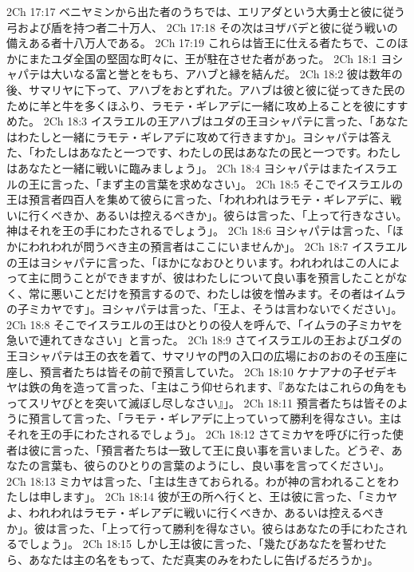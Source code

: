 2Ch 17:17  ベニヤミンから出た者のうちでは、エリアダという大勇士と彼に従う弓および盾を持つ者二十万人、
2Ch 17:18  その次はヨザバデと彼に従う戦いの備えある者十八万人である。
2Ch 17:19  これらは皆王に仕える者たちで、このほかにまたユダ全国の堅固な町々に、王が駐在させた者があった。
2Ch 18:1  ヨシャパテは大いなる富と誉とをもち、アハブと縁を結んだ。
2Ch 18:2  彼は数年の後、サマリヤに下って、アハブをおとずれた。アハブは彼と彼に従ってきた民のために羊と牛を多くほふり、ラモテ・ギレアデに一緒に攻め上ることを彼にすすめた。
2Ch 18:3  イスラエルの王アハブはユダの王ヨシャパテに言った、「あなたはわたしと一緒にラモテ・ギレアデに攻めて行きますか」。ヨシャパテは答えた、「わたしはあなたと一つです、わたしの民はあなたの民と一つです。わたしはあなたと一緒に戦いに臨みましょう」。
2Ch 18:4  ヨシャパテはまたイスラエルの王に言った、「まず主の言葉を求めなさい」。
2Ch 18:5  そこでイスラエルの王は預言者四百人を集めて彼らに言った、「われわれはラモテ・ギレアデに、戦いに行くべきか、あるいは控えるべきか」。彼らは言った、「上って行きなさい。神はそれを王の手にわたされるでしょう」。
2Ch 18:6  ヨシャパテは言った、「ほかにわれわれが問うべき主の預言者はここにいませんか」。
2Ch 18:7  イスラエルの王はヨシャパテに言った、「ほかになおひとりいます。われわれはこの人によって主に問うことができますが、彼はわたしについて良い事を預言したことがなく、常に悪いことだけを預言するので、わたしは彼を憎みます。その者はイムラの子ミカヤです」。ヨシャパテは言った、「王よ、そうは言わないでください」。
2Ch 18:8  そこでイスラエルの王はひとりの役人を呼んで、「イムラの子ミカヤを急いで連れてきなさい」と言った。
2Ch 18:9  さてイスラエルの王およびユダの王ヨシャパテは王の衣を着て、サマリヤの門の入口の広場におのおのその玉座に座し、預言者たちは皆その前で預言していた。
2Ch 18:10  ケナアナの子ゼデキヤは鉄の角を造って言った、「主はこう仰せられます、『あなたはこれらの角をもってスリヤびとを突いて滅ぼし尽しなさい』」。
2Ch 18:11  預言者たちは皆そのように預言して言った、「ラモテ・ギレアデに上っていって勝利を得なさい。主はそれを王の手にわたされるでしょう」。
2Ch 18:12  さてミカヤを呼びに行った使者は彼に言った、「預言者たちは一致して王に良い事を言いました。どうぞ、あなたの言葉も、彼らのひとりの言葉のようにし、良い事を言ってください」。
2Ch 18:13  ミカヤは言った、「主は生きておられる。わが神の言われることをわたしは申します」。
2Ch 18:14  彼が王の所へ行くと、王は彼に言った、「ミカヤよ、われわれはラモテ・ギレアデに戦いに行くべきか、あるいは控えるべきか」。彼は言った、「上って行って勝利を得なさい。彼らはあなたの手にわたされるでしょう」。
2Ch 18:15  しかし王は彼に言った、「幾たびあなたを誓わせたら、あなたは主の名をもって、ただ真実のみをわたしに告げるだろうか」。
